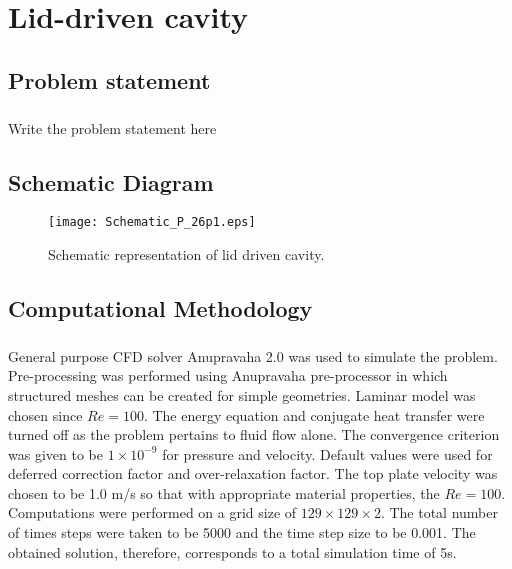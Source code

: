 
\chapter{Lid-driven cavity}

\section{Problem statement}

  \paragraph*{}
Write the problem statement here

\section{Schematic  Diagram}

\begin{figure}[htb!]
	\centering
	\hspace*{2cm}
     \texttt{[image: Schematic\_P\_26p1.eps]}
     \caption{Schematic representation of lid driven cavity.}
     \label{fig:schematicDgm_LDC}
\end{figure}


\section{Computational Methodology}

   \paragraph*{}
General purpose CFD solver Anupravaha 2.0 was used to simulate the problem. Pre-processing was performed using Anupravaha pre-processor in which structured meshes can be created for simple geometries. Laminar model was chosen since $Re = 100.$ The energy equation and conjugate heat transfer were turned off as the problem pertains to fluid flow alone. The convergence criterion was given to be $1\times 10^{-9}$ for pressure and velocity. Default values were used for deferred correction factor and over-relaxation factor. The top plate velocity was chosen to be 1.0 m/s so that with appropriate material properties, the $Re = 100$. Computations were performed on a grid size of  $129\times129\times2$. The total number of times steps were taken to be 5000 and the time step size to be 0.001.  The obtained solution, therefore, corresponds to a total simulation time of 5s.
\vspace*{0.5cm}
